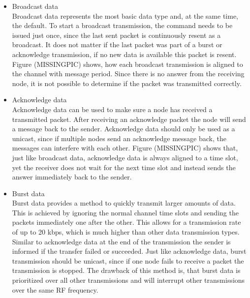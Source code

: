 \begin{itemize}
	\item{Broadcast data} \hfill \\ Broadcast data represents the most basic data type and, at the same time, the default. To start a broadcast transmission, the command needs to be issued just once, since the last sent packet is continuously resent as a broadcast. It does not matter if the last packet was part of a burst or acknowledge transmission, if no new data is available this packet is resent. Figure (MISSINGPIC) shows, how each broadcast transmission is aligned to the channel with message period. Since there is no answer from the receiving node, it is not possible to determine if the packet was transmitted correctly.
	
	\item{Acknowledge data} \hfill \\ Acknowledge data can be used to make sure a node has received a transmitted packet. After receiving an acknowledge packet the node will send a message back to the sender. Acknowledge data should only be used as a unicast, since if multiple nodes send an acknowledge message back, the messages can interfere with each other. Figure (MISSINGPIC) shows that, just like broadcast data, acknowledge data is always aligned to a time slot, yet the receiver does not wait for the next time slot and instead sends the answer immediately back to the sender.
	
	\item{Burst data} \hfill \\ Burst data provides a method to quickly transmit larger amounts of data. This is achieved by ignoring the normal channel time slots and sending the packets immediately one after the other. This allows for a transmission rate of up to 20 kbps, which is much higher than other data transmission types. Similar to acknowledge data at the end of the transmission the sender is informed if the transfer failed or succeeded. Just like acknowledge data, burst transmission should be unicast, since if one node fails to receive a packet the transmission is stopped. The drawback of this method is, that burst data is prioritized over all other transmissions and will interrupt other transmissions over the same RF frequency.
\end{itemize}

